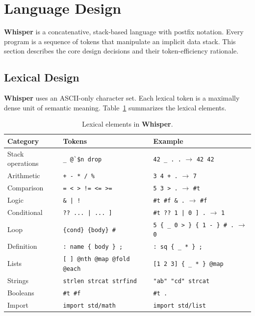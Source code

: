 \documentclass[11pt,a4paper]{article}
\begin{document}
\section{Language Design}
\label{sec:design}

\textbf{Whisper} is a concatenative, stack-based language with postfix
notation. Every program is a sequence of tokens that manipulate an implicit
data stack. This section describes the core design decisions and their
token-efficiency rationale.

\subsection{Lexical Design}

\textbf{Whisper} uses an ASCII-only character set. Each lexical token is a
maximally dense unit of semantic meaning. Table~\ref{tab:lexical} summarizes
the lexical elements.

\begin{table}[ht]
\centering
\small
\caption{Lexical elements in \textbf{Whisper}.}
\label{tab:lexical}
\begin{tabular}{lll}
\toprule
\textbf{Category} & \textbf{Tokens} & \textbf{Example} \\
\midrule
Stack operations & \texttt{\_ \` @ \$n drop} & \texttt{42 \_ . .} $\rightarrow$ \texttt{42 42} \\
Arithmetic & \texttt{+ - * / \%} & \texttt{3 4 + .} $\rightarrow$ \texttt{7} \\
Comparison & \texttt{= < > != <= >=} & \texttt{5 3 > .} $\rightarrow$ \texttt{\#t} \\
Logic & \texttt{\& | !} & \texttt{\#t \#f \& .} $\rightarrow$ \texttt{\#f} \\
Conditional & \texttt{?? ... | ... ]} & \texttt{\#t ?? 1 | 0 ] .} $\rightarrow$ \texttt{1} \\
Loop & \texttt{\{cond\} \{body\} \#} & \texttt{5 \{ \_ 0 > \} \{ 1 - \} \# .} $\rightarrow$ \texttt{0} \\
Definition & \texttt{: name \{ body \} ;} & \texttt{: sq \{ \_ * \} ;} \\
Lists & \texttt{[ ] @nth @map @fold @each} & \texttt{[1 2 3] \{ \_ * \} @map} \\
Strings & \texttt{strlen strcat strfind} & \texttt{"ab" "cd" strcat} \\
Booleans & \texttt{\#t \#f} & \texttt{\#t .} \\
Import & \texttt{import std/math} & \texttt{import std/list} \\
\bottomrule
\end{tabular}
\end{table}
\end{document}
